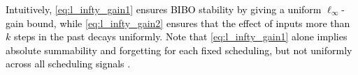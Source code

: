 \documentclass[journal,twoside,web]{ieeecolor}
\begin{document}
    \textcolor{black}{%
    Intuitively, \eqref{eq:l_infty_gain1} ensures BIBO stability by giving a uniform $\ell_\infty$-gain bound, while \eqref{eq:l_infty_gain2} ensures that the effect of inputs more than $k$ steps in the past decays uniformly. Note that \eqref{eq:l_infty_gain1} alone implies absolute summability and forgetting for each fixed scheduling, but not uniformly across all scheduling signals \cite[Chapter~7d, Thm.~17]{Cal:Des}.}
\end{document}
